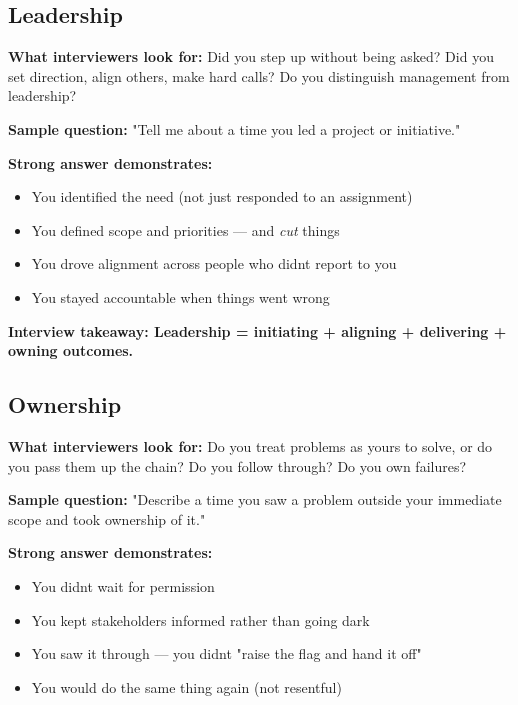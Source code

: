 \documentclass[11pt]{article}
\providecommand{\tightlist}{\setlength{\itemsep}{1pt}\setlength{\parskip}{0pt}}
\begin{document}
\subsection{Leadership}\label{leadership}

\textbf{What interviewers look for:} Did you step up without being asked? Did you set direction, align others, make hard calls? Do you distinguish management from leadership?

\textbf{Sample question:} "Tell me about a time you led a project or initiative."

\textbf{Strong answer demonstrates:}

\begin{itemize}
\tightlist
\item
  You identified the need (not just responded to an assignment)
\item
  You defined scope and priorities --- and \emph{cut} things
\item
  You drove alignment across people who didn\textquotesingle t report to you
\item
  You stayed accountable when things went wrong
\end{itemize}

\textbf{Interview takeaway: Leadership = initiating + aligning + delivering + owning outcomes.}

\subsection{Ownership}\label{ownership}

\textbf{What interviewers look for:} Do you treat problems as yours to solve, or do you pass them up the chain? Do you follow through? Do you own failures?

\textbf{Sample question:} "Describe a time you saw a problem outside your immediate scope and took ownership of it."

\textbf{Strong answer demonstrates:}

\begin{itemize}
\tightlist
\item
  You didn\textquotesingle t wait for permission
\item
  You kept stakeholders informed rather than going dark
\item
  You saw it through --- you didn\textquotesingle t "raise the flag and hand it off"
\item
  You would do the same thing again (not resentful)
\end{itemize}
\end{document}

